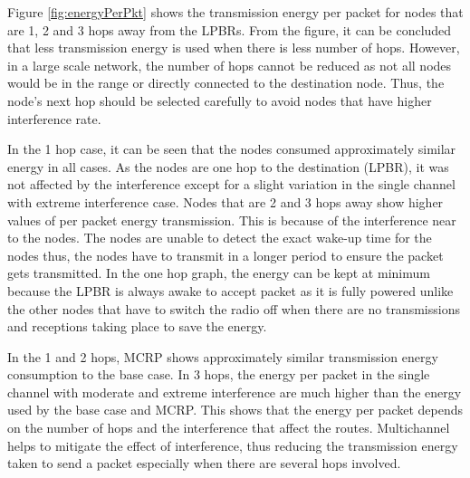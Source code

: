 
Figure \ref{fig:energyPerPkt} shows the transmission energy per packet for nodes that are 1, 2 and 3 hops away from the LPBRs. From the figure, it can be concluded that less transmission energy is used when there is less number of hops. However, in a large scale network, the number of hops cannot be reduced as not all nodes would be in the range or directly connected to the destination node. Thus, the node's next hop should be selected carefully to avoid nodes that have higher interference rate.

In the 1 hop case, it can be seen that the nodes consumed approximately similar energy in all cases. As the nodes are one hop to the destination (LPBR), it was not affected by the interference except for a slight variation in the single channel with extreme interference case. 
Nodes that are 2 and 3 hops away show higher values of per packet energy transmission.
This is because of the interference near to the nodes. The nodes are unable to detect the exact wake-up time for the nodes thus, the nodes have to transmit in a longer period to ensure the packet gets transmitted. In the one hop graph, the energy can be kept at minimum because the LPBR is always awake to accept packet as it is fully powered unlike the other nodes that have to switch the radio off when there are no transmissions and receptions taking place to save the energy.

In the 1 and 2 hops, MCRP shows approximately similar transmission energy consumption to the base case. 
In 3 hops, the energy per packet in the single channel with moderate and extreme interference are much higher than the energy used by the base case and MCRP. This shows that the energy per packet depends on the number of hops and the interference that affect the routes. Multichannel helps to mitigate the effect of interference, thus reducing the transmission energy taken to send a packet especially when there are several hops involved.

